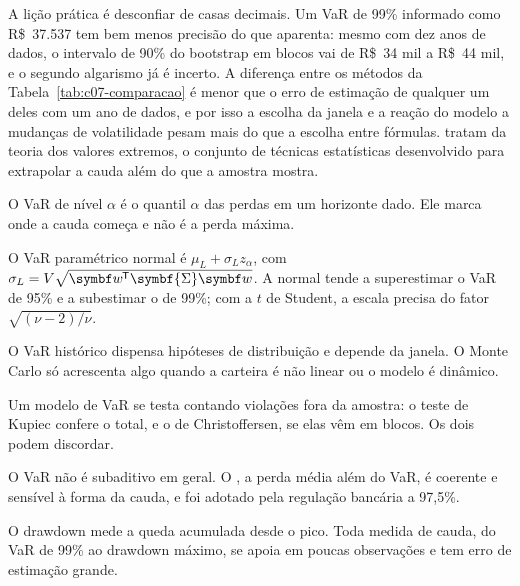 A lição prática é desconfiar de casas decimais. Um VaR de 99\% informado como R\$~37.537 tem bem menos precisão do que aparenta: mesmo com dez anos de dados, o intervalo de 90\% do bootstrap em blocos vai de R\$~34 mil a R\$~44 mil, e o segundo algarismo já é incerto. A diferença entre os métodos da Tabela~\ref{tab:c07-comparacao} é menor que o erro de estimação de qualquer um deles com um ano de dados, e por isso a escolha da janela e a reação do modelo a mudanças de volatilidade pesam mais do que a escolha entre fórmulas. \citet{mcneil2015} tratam da teoria dos valores extremos, o conjunto de técnicas estatísticas desenvolvido para extrapolar a cauda além do que a amostra mostra.

\begin{resumo}
  \item O VaR de nível $\alpha$ é o quantil $\alpha$ das perdas em um horizonte dado. Ele marca onde a cauda começa e não é a perda máxima.
  \item O VaR paramétrico normal é $\mu_L + \sigma_L z_\alpha$, com $\sigma_L = V\sqrt{\vetor{w}\T\symbf{\Sigma}\vetor{w}}$. A normal tende a superestimar o VaR de 95\% e a subestimar o de 99\%; com a $t$ de Student, a escala precisa do fator $\sqrt{(\nu-2)/\nu}$.
  \item O VaR histórico dispensa hipóteses de distribuição e depende da janela. O Monte Carlo só acrescenta algo quando a carteira é não linear ou o modelo é dinâmico.
  \item Um modelo de VaR se testa contando violações fora da amostra: o teste de Kupiec confere o total, e o de Christoffersen, se elas vêm em blocos. Os dois podem discordar.
  \item O VaR não é subaditivo em geral. O , a perda média além do VaR, é coerente e sensível à forma da cauda, e foi adotado pela regulação bancária a 97,5\%.
  \item O drawdown mede a queda acumulada desde o pico. Toda medida de cauda, do VaR de 99\% ao drawdown máximo, se apoia em poucas observações e tem erro de estimação grande.
\end{resumo}

